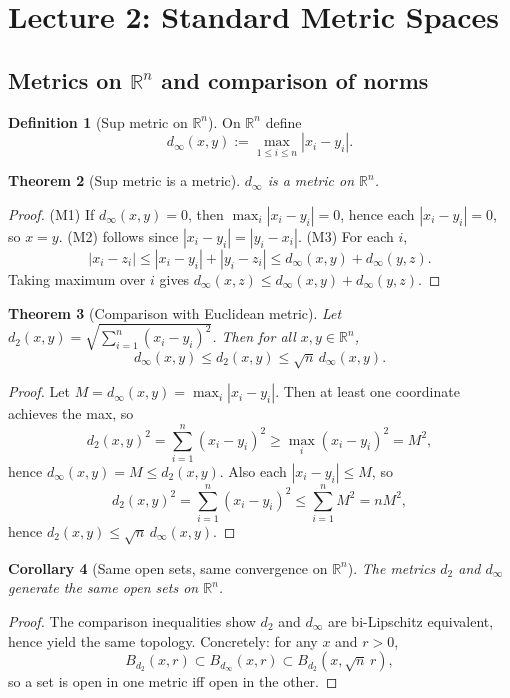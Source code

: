 \documentclass[11pt]{article}
\newtheorem{theorem}{Theorem}[section]
\newtheorem{corollary}[theorem]{Corollary}
\theoremstyle{definition}
\newtheorem{definition}[theorem]{Definition}
\newcommand{\R}{\mathbb{R}}
\begin{document}
\section{Lecture 2: Standard Metric Spaces}

\subsection{Metrics on $\R^n$ and comparison of norms}

\begin{definition}[Sup metric on $\R^n$]
On $\R^n$ define
\[
d_\infty(x,y):=\max_{1\le i\le n}|x_i-y_i|.
\]
\end{definition}

\begin{theorem}[Sup metric is a metric]
$d_\infty$ is a metric on $\R^n$.
\end{theorem}

\begin{proof}
(M1) If $d_\infty(x,y)=0$, then $\max_i|x_i-y_i|=0$, hence each $|x_i-y_i|=0$, so $x=y$.
(M2) follows since $|x_i-y_i|=|y_i-x_i|$.
(M3) For each $i$,
\[
|x_i-z_i|\le |x_i-y_i|+|y_i-z_i|\le d_\infty(x,y)+d_\infty(y,z).
\]
Taking maximum over $i$ gives $d_\infty(x,z)\le d_\infty(x,y)+d_\infty(y,z)$.
\end{proof}

\begin{theorem}[Comparison with Euclidean metric]
Let $d_2(x,y)=\sqrt{\sum_{i=1}^n (x_i-y_i)^2}$. Then for all $x,y\in\R^n$,
\[
d_\infty(x,y)\le d_2(x,y)\le \sqrt{n}\,d_\infty(x,y).
\]
\end{theorem}

\begin{proof}
Let $M=d_\infty(x,y)=\max_i|x_i-y_i|$.
Then at least one coordinate achieves the max, so
\[
d_2(x,y)^2=\sum_{i=1}^n (x_i-y_i)^2\ge \max_i (x_i-y_i)^2=M^2,
\]
hence $d_\infty(x,y)=M\le d_2(x,y)$.
Also each $|x_i-y_i|\le M$, so
\[
d_2(x,y)^2=\sum_{i=1}^n (x_i-y_i)^2\le \sum_{i=1}^n M^2=nM^2,
\]
hence $d_2(x,y)\le \sqrt{n}\,d_\infty(x,y)$.
\end{proof}

\begin{corollary}[Same open sets, same convergence on $\R^n$]
The metrics $d_2$ and $d_\infty$ generate the same open sets on $\R^n$.
\end{corollary}

\begin{proof}
The comparison inequalities show $d_2$ and $d_\infty$ are bi-Lipschitz equivalent, hence yield the same topology.
Concretely: for any $x$ and $r>0$,
\[
B_{d_2}(x,r)\subset B_{d_\infty}(x,r)\subset B_{d_2}(x,\sqrt n\,r),
\]
so a set is open in one metric iff open in the other.
\end{proof}
\end{document}
